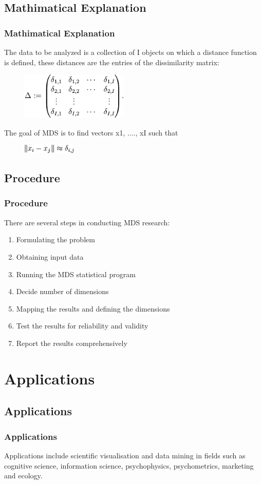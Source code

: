 \documentclass[compress,handout,10pt]{beamer}
\let\olditem\item
\renewcommand{\item}{\setlength{\itemsep}{0.5\baselineskip}\olditem}
\begin{document}
\subsection{Mathimatical Explanation}
\begin{frame}
    \frametitle{Mathimatical Explanation}
The data to be analyzed is a collection of I objects on which a distance function is defined, these distances are the entries of the dissimilarity matrix:
\begin{figure}[h]
    \begin{center}
        \includegraphics[width=2in]{1.png}
    \end{center}
\end{figure}  
The goal of MDS is to find  vectors x1, ...., xI such that
\begin{figure}[h]
    \begin{center}
        \includegraphics[width=1in]{2.png}
    \end{center}
\end{figure} 
\end{frame}



 \subsection{Procedure}
\begin{frame}
       \frametitle{Procedure}
There are several steps in conducting MDS research:
    \begin{enumerate}
        \item Formulating the problem
        \item Obtaining input data 
        \item Running the MDS statistical program
        \item Decide number of dimensions
        \item Mapping the results and defining the dimensions
        \item Test the results for reliability and validity
       \item Report the results comprehensively 
     \end{enumerate}
\end{frame}

 



\section{Applications}
\subsection{Applications}
\begin{frame}
    \frametitle{Applications}
  Applications include scientific visualisation and data mining in fields such as cognitive science, information science, psychophysics, psychometrics, marketing and ecology. 


\end{frame}
\end{document}
